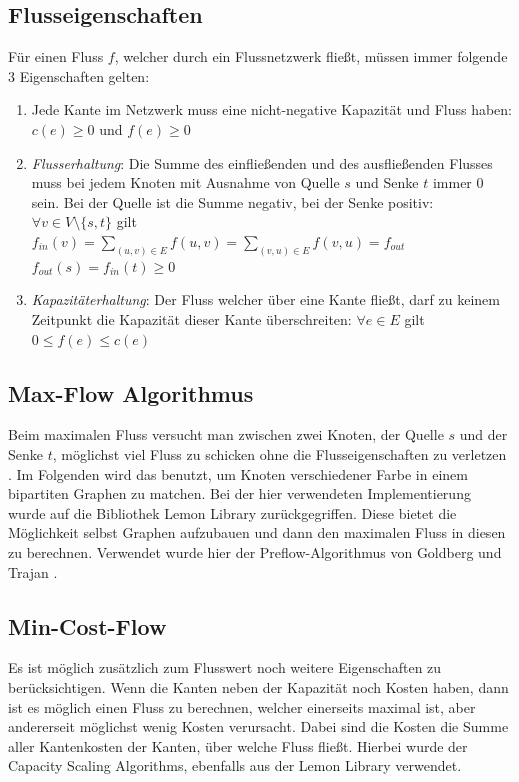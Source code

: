     \subsection{Flusseigenschaften}
        Für einen Fluss $f$, welcher durch ein Flussnetzwerk fließt, müssen immer folgende 3 Eigenschaften gelten:
        \begin{enumerate}
            \item Jede Kante im Netzwerk muss eine nicht-negative Kapazität und Fluss haben: $c(e) \geq 0$ und $f(e) \geq 0$
            \item \textit{Flusserhaltung}: Die Summe des einfließenden und des ausfließenden Flusses muss bei jedem Knoten mit Ausnahme von Quelle $s$ und Senke $t$ immer 0 sein. Bei der Quelle ist die Summe negativ, bei der Senke positiv: \newline 
            $\forall v \in V \setminus \{s, t\}$ gilt $f_{in}(v) = \sum_{(u, v) \in E}f(u, v) = \sum_{(v, u) \in E}f(v, u) = f_{out}$ \newline
            $f_{out}(s) = f_{in}(t) \geq 0$
            \item \textit{Kapazitäterhaltung}: Der Fluss welcher über eine Kante fließt, darf zu keinem Zeitpunkt die Kapazität dieser Kante überschreiten: $\forall e \in E$ gilt $0 \leq f(e) \leq c(e)$
        \end{enumerate}

    \subsection{Max-Flow Algorithmus} \label{sec:Max-Flow}
        Beim maximalen Fluss versucht man zwischen zwei Knoten, der Quelle $s$ und der Senke $t$, möglichst viel Fluss zu schicken ohne die Flusseigenschaften zu verletzen \cite{Graphen_Skript}. Im Folgenden wird das benutzt, um Knoten verschiedener Farbe in einem bipartiten Graphen zu matchen.
        Bei der hier verwendeten Implementierung wurde auf die Bibliothek Lemon Library \cite{Lemon-Lib} zurückgegriffen. Diese bietet die Möglichkeit selbst Graphen aufzubauen und dann den maximalen Fluss in diesen zu berechnen. Verwendet wurde hier der Preflow-Algorithmus von Goldberg und Trajan \cite{Preflow-article}.

    \subsection{Min-Cost-Flow} \label{sec:Min-Cost-Flow}
        Es ist möglich zusätzlich zum Flusswert noch weitere Eigenschaften zu berücksichtigen. Wenn die Kanten neben der Kapazität noch Kosten haben, dann ist es möglich einen Fluss zu berechnen, welcher einerseits maximal ist, aber andererseit möglichst wenig Kosten verursacht. Dabei sind die Kosten die Summe aller Kantenkosten der Kanten, über welche Fluss fließt. Hierbei wurde der Capacity Scaling Algorithms, ebenfalls aus der Lemon Library \cite{Lemon-Lib} verwendet.


